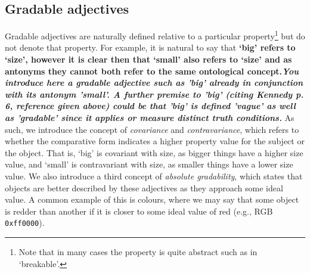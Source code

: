 \documentclass[11pt]{article}
\begin{document}
\subsection{Gradable adjectives}

Gradable adjectives are naturally defined relative to a particular 
property\footnote{Note that in many cases the property is quite abstract such as in 
`breakable'.} but do not denote that property. For example, it is natural to say that \textbf{`big' refers to 
`size', however it is clear then that `small' also refers to `size' and as antonyms 
they cannot both refer to the same ontological concept.\textit{You introduce here a gradable adjective such as 'big' already in conjunction with its antonym 'small'. A further premise to 'big' (citing Kennedy p. 6, reference given above) could be that 'big' is defined 'vague' as well as 'gradable' since it applies or measure distinct truth conditions. }} As such, we introduce 
the concept of \emph{covariance} and \emph{contravariance}, which refers to 
whether the comparative form indicates a higher property value for the subject 
or the object. That is, `big' is covariant with size, as bigger things have 
a higher size value, and `small' is contravariant with size, as smaller things have 
a lower size value. We also introduce a third concept of \emph{absolute gradability}, 
which states that objects are better described by these adjectives as they approach some ideal value. 
A common example of this is colours, where we may say that some object is 
redder than another if it is closer to some ideal value of red (e.g., RGB {\tt 0xff0000}). 
\end{document}
